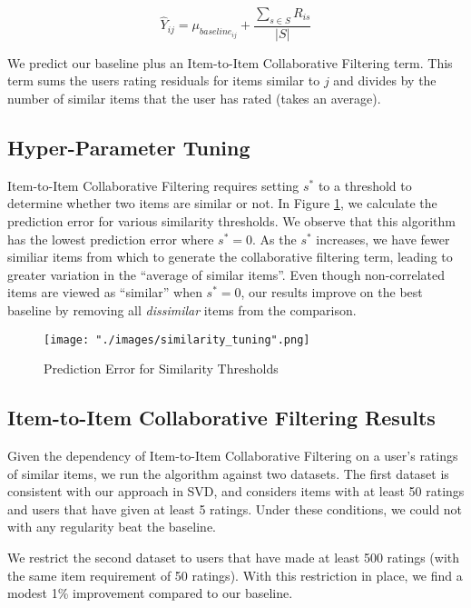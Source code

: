 \documentclass[12pt]{article}
\begin{document}
$$ \hat Y_{ij} = \mu_{baseline_{ij}} + \frac{\sum\limits_{s \in S} R_{is}}{|S|}$$

We predict our baseline plus an Item-to-Item Collaborative Filtering term.\textsuperscript{\cite{gower}} This term sums the users rating residuals for items similar to $j$ and divides by the number of similar items that the user has rated (takes an average).

\subsection*{Hyper-Parameter Tuning}
Item-to-Item Collaborative Filtering requires setting $s^*$ to a threshold to determine whether two items are similar or not. In Figure \ref{fig:similarity_tuning}, we calculate the prediction error for various similarity thresholds. We observe that this algorithm has the lowest prediction error where $s^* = 0$. As the $s^*$ increases, we have fewer similiar items from which to generate the collaborative filtering term, leading to greater variation in the ``average of similar items''. Even though non-correlated items are viewed as ``similar'' when $s^* = 0$, our results improve on the best baseline by removing all \textit{dissimilar} items from the comparison.

\begin{figure}[!ht]
\centering
    \texttt{[image: "./images/similarity\_tuning".png]}
    \caption{Prediction Error for Similarity Thresholds}
    \label{fig:similarity_tuning}
\end{figure}

\subsection*{Item-to-Item Collaborative Filtering Results}

Given the dependency of Item-to-Item Collaborative Filtering on a user's ratings of similar items, we run the algorithm against two datasets. The first dataset is consistent with our approach in SVD, and considers items with at least 50 ratings and users that have given at least 5 ratings. Under these conditions, we could not with any regularity beat the baseline.

We restrict the second dataset to users that have made at least 500 ratings (with the same item requirement of 50 ratings). With this restriction in place, we find a modest 1\% improvement compared to our baseline.
\end{document}
